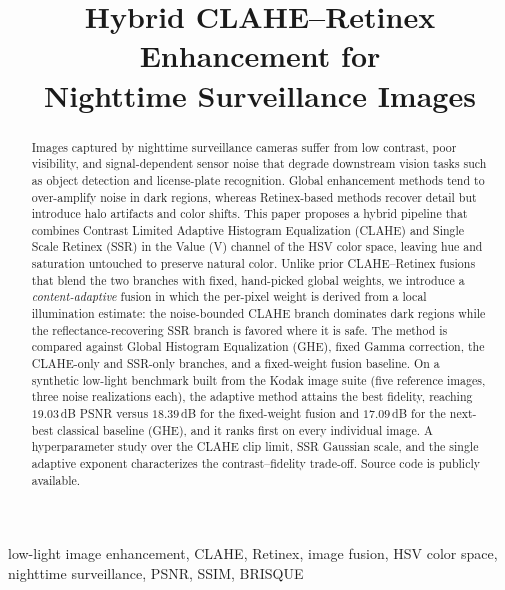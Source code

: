 \documentclass[conference,a4paper]{IEEEtran}
\begin{document}
\title{Hybrid CLAHE--Retinex Enhancement for\\ Nighttime Surveillance Images}

\author{
}

\maketitle

\begin{abstract}
Images captured by nighttime surveillance cameras suffer from low contrast,
poor visibility, and signal-dependent sensor noise that degrade downstream
vision tasks such as object detection and license-plate recognition. Global
enhancement methods tend to over-amplify noise in dark regions, whereas
Retinex-based methods recover detail but introduce halo artifacts and color
shifts. This paper proposes a hybrid pipeline that combines Contrast Limited
Adaptive Histogram Equalization (CLAHE) and Single Scale Retinex (SSR) in the
Value (V) channel of the HSV color space, leaving hue and saturation untouched
to preserve natural color. Unlike prior CLAHE--Retinex fusions that blend the
two branches with fixed, hand-picked global weights, we introduce a
\emph{content-adaptive} fusion in which the per-pixel weight is derived from a
local illumination estimate: the noise-bounded CLAHE branch dominates dark
regions while the reflectance-recovering SSR branch is favored where it is safe.
The method is compared against Global Histogram Equalization (GHE), fixed Gamma
correction, the CLAHE-only and SSR-only branches, and a fixed-weight fusion
baseline. On a synthetic low-light benchmark built from the Kodak image suite
(five reference images, three noise realizations each), the adaptive method
attains the best fidelity, reaching $19.03$\,dB PSNR versus $18.39$\,dB for the
fixed-weight fusion and $17.09$\,dB for the next-best classical baseline (GHE),
and it ranks first on every individual image. A hyperparameter study over the
CLAHE clip limit, SSR Gaussian scale, and the single adaptive exponent
characterizes the contrast--fidelity trade-off. Source code is publicly
available.
\end{abstract}

\begin{IEEEkeywords}
low-light image enhancement, CLAHE, Retinex, image fusion, HSV color space,
nighttime surveillance, PSNR, SSIM, BRISQUE
\end{IEEEkeywords}
\end{document}
